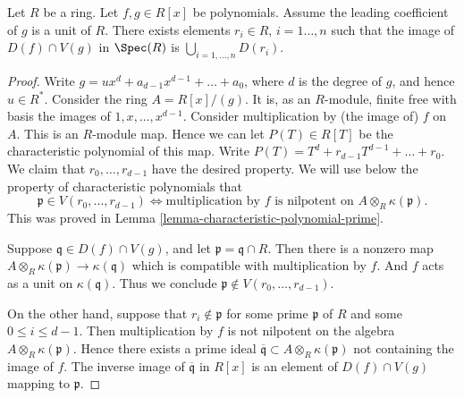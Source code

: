 \begin{lemma}
\label{lemma-affineline-special}
Let $R$ be a ring. Let $f, g \in R[x]$ be polynomials.
Assume the leading coefficient of $g$ is a unit of $R$.
There exists elements $r_i\in R$, $i = 1\ldots, n$ such that
the image of $D(f) \cap V(g)$ in $\Spec(R)$ is
$\bigcup_{i = 1, \ldots, n} D(r_i)$.
\end{lemma}

\begin{proof}
Write $g = ux^d + a_{d-1}x^{d-1} + \ldots + a_0$, where
$d$ is the degree of $g$, and hence $u \in R^*$.
Consider the ring $A = R[x]/(g)$.
It is, as an $R$-module, finite free with basis the images
of $1, x, \ldots, x^{d-1}$. Consider multiplication
by (the image of) $f$ on $A$. This is an $R$-module map.
Hence we can let $P(T) \in R[T]$ be the characteristic polynomial
of this map. Write $P(T) = T^d + r_{d-1} T^{d-1} + \ldots + r_0$.
We claim that $r_0, \ldots, r_{d-1}$ have the desired property.
We will use below the property of characteristic polynomials
that
$$
\mathfrak p \in V(r_0, \ldots, r_{d-1})
\Leftrightarrow
\text{multiplication by }f\text{ is nilpotent on }
A \otimes_R \kappa(\mathfrak p).
$$
This was proved in Lemma \ref{lemma-characteristic-polynomial-prime}.

\medskip\noindent
Suppose $\mathfrak q\in D(f) \cap V(g)$, and let
$\mathfrak p = \mathfrak q \cap R$. Then there is a nonzero map
$A \otimes_R \kappa(\mathfrak p) \to \kappa(\mathfrak q)$ which
is compatible with multiplication by $f$.
And $f$ acts as a unit on $\kappa(\mathfrak q)$.
Thus we conclude $\mathfrak p \not \in  V(r_0, \ldots, r_{d-1})$.

\medskip\noindent
On the other hand, suppose that $r_i \not\in \mathfrak p$ for some
prime $\mathfrak p$ of $R$ and some $0 \leq i \leq d - 1$.
Then multiplication by $f$ is not nilpotent on the algebra
$A \otimes_R \kappa(\mathfrak p)$.
Hence there exists a prime ideal $\overline{\mathfrak q} \subset
A \otimes_R \kappa(\mathfrak p)$ not containing the image of $f$.
The inverse image of $\overline{\mathfrak q}$ in $R[x]$
is an element of $D(f) \cap V(g)$ mapping to $\mathfrak p$.
\end{proof}